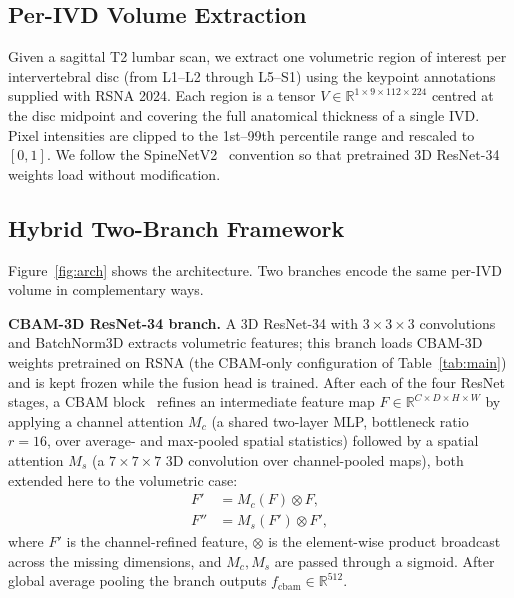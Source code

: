 \documentclass[runningheads]{llncs}
\begin{document}
\subsection{Per-IVD Volume Extraction}

Given a sagittal T2 lumbar scan, we extract one volumetric region of interest per intervertebral disc (from L1--L2 through L5--S1) using the keypoint annotations supplied with RSNA 2024. Each region is a tensor $V \in \mathbb{R}^{1 \times 9 \times 112 \times 224}$ centred at the disc midpoint and covering the full anatomical thickness of a single IVD. Pixel intensities are clipped to the 1st--99th percentile range and rescaled to $[0, 1]$. We follow the SpineNetV2~\cite{windsor2022} convention so that pretrained 3D ResNet-34 weights load without modification.

\subsection{Hybrid Two-Branch Framework}\label{wf}

Figure~\ref{fig:arch} shows the architecture. Two branches encode the same per-IVD volume in complementary ways.

\textbf{CBAM-3D ResNet-34 branch.}
A 3D ResNet-34 with $3 \times 3 \times 3$ convolutions and BatchNorm3D extracts volumetric features; this branch loads CBAM-3D weights pretrained on RSNA (the CBAM-only configuration of Table~\ref{tab:main}) and is kept frozen while the fusion head is trained. After each of the four ResNet stages, a CBAM block~\cite{woo2018cbam} refines an intermediate feature map $F \in \mathbb{R}^{C \times D \times H \times W}$ by applying a channel attention $M_c$ (a shared two-layer MLP, bottleneck ratio $r=16$, over average- and max-pooled spatial statistics) followed by a spatial attention $M_s$ (a $7\!\times\!7\!\times\!7$ 3D convolution over channel-pooled maps), both extended here to the volumetric case:
\begin{align}
F' &= M_c(F) \otimes F, \label{eq:cbam_c}\\
F'' &= M_s(F') \otimes F', \label{eq:cbam_s}
\end{align}
where $F'$ is the channel-refined feature, $\otimes$ is the element-wise product broadcast across the missing dimensions, and $M_c, M_s$ are passed through a sigmoid. After global average pooling the branch outputs $f_{\text{cbam}} \in \mathbb{R}^{512}$.
\end{document}
